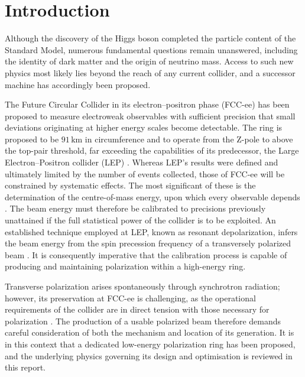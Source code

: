 \documentclass[%
 aip,
 amsmath,amssymb,
 reprint,%
superscriptaddress
]{revtex4-2}
\begin{document}

\section{Introduction}

Although the discovery of the Higgs boson completed the particle content of the Standard Model, numerous fundamental questions remain unanswered, including the identity of dark matter and the origin of neutrino mass.
Access to such new physics most likely lies beyond the reach of any current collider, and a successor machine has accordingly been proposed.


The Future Circular Collider in its electron–positron phase (FCC-ee) has been proposed to measure electroweak observables with sufficient precision that small deviations originating at higher energy scales become detectable.
The ring is proposed to be $91\,\text{km}$ in circumference and to operate from the Z-pole to above the top-pair threshold, far exceeding the capabilities of its predecessor, the Large Electron–Positron collider (LEP) \cite{dam_precision_2016,assmann_spin_2001,denterria_physics_2016}.
Whereas LEP's results were defined and ultimately limited by the number of events collected, those of FCC-ee will be constrained by systematic effects.
The most significant of these is the determination of the centre-of-mass energy, upon which every observable depends \cite{denterria_physics_2016,maestre_z_2021}.
The beam energy must therefore be calibrated to precisions previously unattained if the full statistical power of the collider is to be exploited.
An established technique employed at LEP, known as resonant depolarization, infers the beam energy from the spin precession frequency of a transversely polarized beam \cite{keintzel_wu_kiel_sagan_wilkinson_oide_bauche_hofle_blondel_jiang_2025}.
It is consequently imperative that the calibration process is capable of producing and maintaining polarization within a high-energy ring.


Transverse polarization arises spontaneously through synchrotron radiation; however, its preservation at FCC-ee is challenging, as the operational requirements of the collider are in direct tension with those necessary for polarization \cite{blondel_polarization_2019,keintzel_wu_kiel_sagan_wilkinson_oide_bauche_hofle_blondel_jiang_2025}.
The production of a usable polarized beam therefore demands careful consideration of both the mechanism and location of its generation.
It is in this context that a dedicated low-energy polarization ring has been proposed, and the underlying physics governing its design and optimisation is reviewed in this report.
\end{document}
